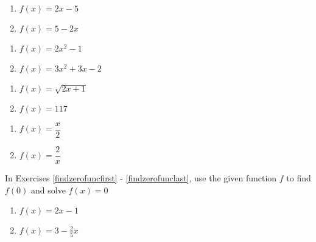 \begin{multicols}{2}
\begin{enumerate}
\setcounter{enumi}{\value{HW}}

\item $f(x) = 2x-5$ \label{secondfuncnotationbasicfirst}
\item $f(x) = 5-2x$

\setcounter{HW}{\value{enumi}}
\end{enumerate}
\end{multicols}

\begin{multicols}{2}
\begin{enumerate}
\setcounter{enumi}{\value{HW}}

\item $f(x) = 2x^2 - 1$
\item $f(x) = 3x^2+3x-2$

\setcounter{HW}{\value{enumi}}
\end{enumerate}
\end{multicols}
 
\begin{multicols}{2}
\begin{enumerate}
\setcounter{enumi}{\value{HW}}

\item $f(x) = \sqrt{2x+1}$
\item $f(x) = 117$

\setcounter{HW}{\value{enumi}}
\end{enumerate}
\end{multicols}

\begin{multicols}{2}
\begin{enumerate}
\setcounter{enumi}{\value{HW}}

\item $f(x) = \dfrac{x}{2}$
\item $f(x) = \dfrac{2}{x}$ \label{secondfuncnotationbasiclast}

\setcounter{HW}{\value{enumi}}
\end{enumerate}
\end{multicols}

In Exercises \ref{findzerofuncfirst} - \ref{findzerofunclast}, use the given function $f$ to find $f(0)$ and solve $f(x) = 0$

\begin{multicols}{2}
\begin{enumerate}
\setcounter{enumi}{\value{HW}}

\item $f(x) = 2x - 1$ \label{findzerofuncfirst}
\item $f(x) = 3 - \frac{2}{5} x$

\setcounter{HW}{\value{enumi}}
\end{enumerate}
\end{multicols}

